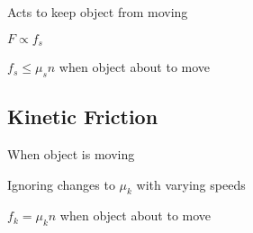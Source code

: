 \documentclass[12pt]{article}
\begin{document}
\begin{spacing}{1.5}
\begin{itemize*}
	\item Acts to keep object from moving
	\item $F \propto f_s$
	\item $f_s \le \mu_s n$ when object about to move
\end{itemize*}

\subsection{Kinetic Friction}

\begin{itemize*}
	\item When object is moving
	\item Ignoring changes to $\mu_k$ with varying speeds
	\item $f_k = \mu_k n$ when object about to move
\end{itemize*}

\end{spacing}
\end{document}
